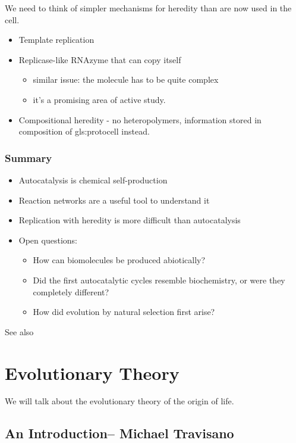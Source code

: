 \documentclass[]{article}
\begin{document}
We need to think of simpler mechanisms for heredity than are now used in the cell.
\begin{itemize}
	\item Template replication
	\item  Replicase-like RNAzyme that can copy itself
	\begin{itemize}
		\item similar issue: the molecule has to be quite complex
		\item it’s a promising area of active study.
	\end{itemize}
	\item Compositional heredity - no heteropolymers, 	information stored in composition of \gls{gls:protocell} instead\cite{vasas2012evolution,segre2000compositional}.
\end{itemize}

\subsubsection{Summary}

\begin{itemize}
	\item Autocatalysis is chemical self-production
	\item Reaction networks are a useful tool to understand it
	\item Replication with heredity is more difficult than autocatalysis
	\item Open questions:
	\begin{itemize}
		\item  How can biomolecules be produced abiotically?
		\item Did the first autocatalytic cycles resemble biochemistry,
		or were they completely different?
		\item How did evolution by natural selection first arise?
	\end{itemize}
\end{itemize}

See also   \cite{carnall2010mechanosensitive,king1977symbiosis,king1982recycling,szathmary2000evolution,virgo2016complex}


\section{Evolutionary Theory}

We will talk about the evolutionary theory of the origin of life.

\subsection[An Introduction]{An Introduction-- Michael Travisano}
\end{document}
